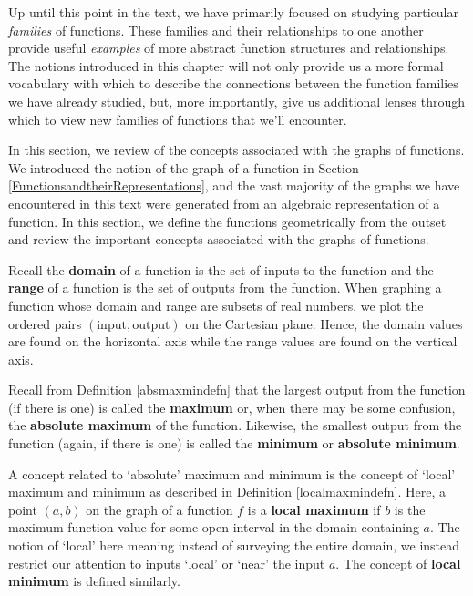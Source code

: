\documentclass{ximera}
\begin{document}
	\author{Stitz-Zeager}




\setcounter{footnote}{0}

\label{GraphsofFunctions}

Up until this point in the text, we have primarily focused on studying particular \textit{families} of functions.  These families and their relationships to one another provide useful \textit{examples} of more abstract function structures and relationships.  The notions introduced in this chapter will not only provide us a more formal vocabulary with which to describe the connections between the function families we have already studied, but, more importantly,  give us additional lenses through which to  view  new families of functions that we'll encounter.

\smallskip


In this section, we review of the concepts associated with the graphs of functions.  We introduced the notion of the graph of a function  in Section \ref{FunctionsandtheirRepresentations}, and the vast majority of the graphs we have encountered in this text were generated from an algebraic representation of a function.  In this section, we define the functions geometrically from the outset and review the important concepts associated with the graphs of functions.

\smallskip

Recall the \textbf{domain} of a function is the set of inputs to the function and the \textbf{range} of a function is the set of outputs from the function.  When graphing a function whose domain and range are subsets of real numbers, we plot the ordered pairs $(\text{input}, \text{output})$ on the Cartesian plane.  Hence, the domain values are found on the horizontal axis while the range values are found on the vertical axis.

\smallskip

Recall from Definition \ref{absmaxmindefn} that the largest output from the function (if there is one) is called the \textbf{maximum} or, when there may be some confusion, the \textbf{absolute maximum} of the function.  Likewise, the smallest output from the function (again, if there is one) is called the \textbf{minimum} or \textbf{absolute minimum}.  

\smallskip

A concept related to `absolute' maximum and minimum is the concept of `local'  maximum and minimum as described in  Definition \ref{localmaxmindefn}.  Here, a point $(a,b)$ on the graph of a function $f$ is a \textbf{local maximum} if $b$ is the maximum function value for some open interval in the domain containing $a$.  The notion of `local' here meaning instead of surveying the entire domain, we instead restrict our attention to inputs `local' or `near' the input $a$.  The concept of \textbf{local minimum} is defined similarly.
\end{document}
